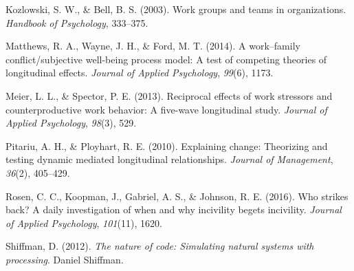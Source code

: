 \documentclass[english,,man]{apa6}
\theoremstyle{definition}
\theoremstyle{definition}
\theoremstyle{definition}
\theoremstyle{remark}
\begin{document}
\leavevmode\hypertarget{ref-kozlowski2003}{}%
Kozlowski, S. W., \& Bell, B. S. (2003). Work groups and teams in
organizations. \emph{Handbook of Psychology}, 333--375.

\leavevmode\hypertarget{ref-matthews2014}{}%
Matthews, R. A., Wayne, J. H., \& Ford, M. T. (2014). A work--family
conflict/subjective well-being process model: A test of competing
theories of longitudinal effects. \emph{Journal of Applied Psychology},
\emph{99}(6), 1173.

\leavevmode\hypertarget{ref-meier2013}{}%
Meier, L. L., \& Spector, P. E. (2013). Reciprocal effects of work
stressors and counterproductive work behavior: A five-wave longitudinal
study. \emph{Journal of Applied Psychology}, \emph{98}(3), 529.

\leavevmode\hypertarget{ref-pitariu2010}{}%
Pitariu, A. H., \& Ployhart, R. E. (2010). Explaining change: Theorizing
and testing dynamic mediated longitudinal relationships. \emph{Journal
of Management}, \emph{36}(2), 405--429.

\leavevmode\hypertarget{ref-rosen2016}{}%
Rosen, C. C., Koopman, J., Gabriel, A. S., \& Johnson, R. E. (2016). Who
strikes back? A daily investigation of when and why incivility begets
incivility. \emph{Journal of Applied Psychology}, \emph{101}(11), 1620.

\leavevmode\hypertarget{ref-shiffman2012}{}%
Shiffman, D. (2012). \emph{The nature of code: Simulating natural
systems with processing}. Daniel Shiffman.
\end{document}
